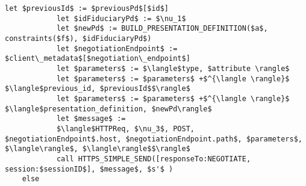 \begin{lstlisting}[language=pseudo, caption={Modificação na relação de um Fiduciário $R^{fid}$: Processamento de Requisições HTTPS}, firstnumber=70, label={lst:fid-relation}]
            let $previousId$ := $previousPd$[$id$]
            let $idFiduciaryPd$ := $\nu_1$
            let $newPd$ := BUILD_PRESENTATION_DEFINITION($a$, constraints($f$), $idFiduciaryPd$) 
            let $negotiationEndpoint$ := $client\_metadata$[$negotiation\_endpoint$]
            let $parameters$ := $\langle$type, $attribute \rangle$
            let $parameters$ := $parameters$ +$^{\langle \rangle}$ $\langle$previous_id, $previousId$$\rangle$
            let $parameters$ := $parameters$ +$^{\langle \rangle}$ $\langle$presentation_definition, $newPd\rangle$
            let $message$ := 
            $\langle$HTTPReq, $\nu_3$, POST, $negotiationEndpoint$.host, $negotiationEndpoint.path$, $parameters$, $\langle\rangle$, $\langle\rangle$$\rangle$
            call HTTPS_SIMPLE_SEND([responseTo:NEGOTIATE, session:$sessionID$], $message$, $s'$ )
    else
\end{lstlisting}